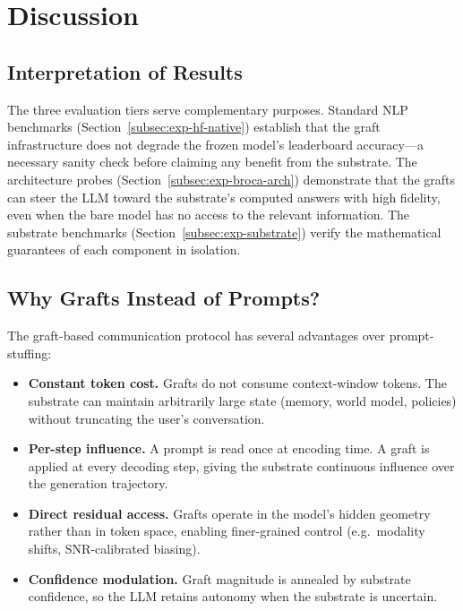
\section{Discussion}
\label{sec:discussion}

\subsection{Interpretation of Results}

The three evaluation tiers serve complementary purposes.  Standard NLP
benchmarks (Section~\ref{subsec:exp-hf-native}) establish that the graft
infrastructure does not degrade the frozen model's leaderboard accuracy---a
necessary sanity check before claiming any benefit from the substrate.  The
architecture probes (Section~\ref{subsec:exp-broca-arch}) demonstrate that the
grafts can steer the LLM toward the substrate's computed answers with high
fidelity, even when the bare model has no access to the relevant information.
The substrate benchmarks (Section~\ref{subsec:exp-substrate}) verify the
mathematical guarantees of each component in isolation.

\subsection{Why Grafts Instead of Prompts?}

The graft-based communication protocol has several advantages over
prompt-stuffing:

\begin{itemize}[nosep]
  \item \textbf{Constant token cost.}  Grafts do not consume context-window
    tokens.  The substrate can maintain arbitrarily large state (memory, world
    model, policies) without truncating the user's conversation.
  \item \textbf{Per-step influence.}  A prompt is read once at encoding time.
    A graft is applied at every decoding step, giving the substrate continuous
    influence over the generation trajectory.
  \item \textbf{Direct residual access.}  Grafts operate in the model's hidden
    geometry rather than in token space, enabling finer-grained control (e.g.\
    modality shifts, SNR-calibrated biasing).
  \item \textbf{Confidence modulation.}  Graft magnitude is annealed by
    substrate confidence, so the LLM retains autonomy when the substrate is
    uncertain.
\end{itemize}

